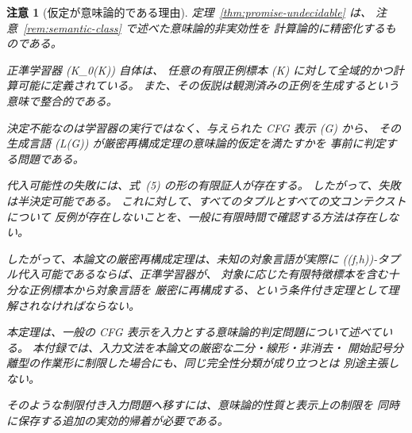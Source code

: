 \documentclass[11pt,a4paper]{ltjsarticle}
\newtheorem{remark}[theorem]{注意}
\theoremstyle{remark}
\begin{document}
\begin{remark}[仮定が意味論的である理由]
\label{rem:promise-undecidable}
定理~\ref{thm:promise-undecidable} は、
注意~\ref{rem:semantic-class} で述べた意味論的非実効性を
計算論的に精密化するものである。

正準学習器 (K\mapsto{}_0(K)) 自体は、
任意の有限正例標本 (K) に対して全域的かつ計算可能に定義されている。
また、その仮説は観測済みの正例を生成するという意味で整合的である。

決定不能なのは学習器の実行ではなく、与えられた CFG 表示 (G) から、
その生成言語 (L(G)) が厳密再構成定理の意味論的仮定を満たすかを
事前に判定する問題である。

代入可能性の失敗には、式~\textup{(5)} の形の有限証人が存在する。
したがって、失敗は半決定可能である。
これに対して、すべてのタプルとすべての文コンテクストについて
反例が存在しないことを、一般に有限時間で確認する方法は存在しない。

したがって、本論文の厳密再構成定理は、未知の対象言語が実際に
((f,h))-タプル代入可能であるならば、正準学習器が、
対象に応じた有限特徴標本を含む十分な正例標本から対象言語を
厳密に再構成する、という条件付き定理として理解されなければならない。

本定理は、一般の CFG 表示を入力とする意味論的判定問題について述べている。
本付録では、入力文法を本論文の厳密な二分・線形・非消去・
開始記号分離型の作業形に制限した場合にも、同じ完全性分類が成り立つとは
別途主張しない。

そのような制限付き入力問題へ移すには、意味論的性質と表示上の制限を
同時に保存する追加の実効的帰着が必要である。
\end{remark}
\end{document}
